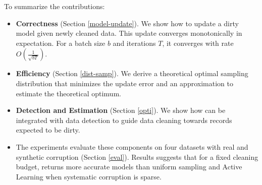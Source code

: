 \noindent To summarize the contributions:
\begin{itemize}[noitemsep]
\item \textbf{Correctness} (Section \ref{model-update}). We show how to update a dirty model given newly cleaned data. This update converges monotonically in expectation. For a batch size $b$ and iterations $T$, it converges with rate $O(\frac{1}{\sqrt{bT}})$. 
\item \textbf{Efficiency} (Section \ref{dist-samp}). We derive a theoretical optimal sampling distribution that minimizes the update error and an approximation to estimate the theoretical optimum.
\item \textbf{Detection and Estimation} (Section \ref{opti}). We show how \sys can be integrated with data detection to guide data cleaning towards records expected to be dirty.
\item The experiments evaluate these components on four datasets with real and synthetic corruption (Section \ref{eval}). Results suggests that for a fixed cleaning budget, \sys returns more accurate models than uniform sampling and Active Learning when systematic corruption is sparse.

\end{itemize}






